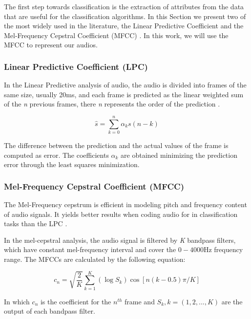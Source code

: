 \documentclass[12pt]{article}
\begin{document}
The first step towards classification is the extraction of attributes from the data that are useful for the classification algorithms. In this Section we present two of the most widely used in the literature, the Linear Predictive Coefficient \cite{Rabiner:1993:FSR:153687} and the Mel-Frequency Cepstral Coefficient (MFCC) \cite{xu2005automatic}. In this work, we will use the MFCC to represent our audios.

\subsubsection{Linear Predictive Coefficient (LPC)}\label{class:lpc}

In the Linear Predictive analysis of audio, the audio is divided into frames of the same size, usually 20ms, and each frame is predicted as the linear weighted sum of the \textit{n} previous frames, there \textit{n} represents the order of the prediction \cite{Rabiner:1993:FSR:153687}. 

\begin{equation}
	\hat{s} = \sum_{k=0}^{n} \alpha_ks(n-k)
	\label{eq:lpc}
\end{equation}


The difference between the prediction and the actual values of the frame is computed as error. The coefficients $\alpha_k$ are obtained minimizing the prediction error through the least squares minimization.


\subsubsection{Mel-Frequency Cepstral Coefficient (MFCC)} \label{class:mfcc}

The Mel-Frequency cepstrum is efficient in modeling pitch and frequency content of audio signals. It yields better results when coding audio for in classification tasks than the LPC \cite{li2001classification}.

In the mel-cepstral analysis, the audio signal is filtered by \textit{K} bandpass filters, which have constant mel-frequency interval and cover the $0-4000$Hz frequency range. The MFCCs are calculated by the following equation:

\begin{equation}
	c_n = \sqrt{\frac{2}{K}} \sum_{k=1}^{K} (\log S_k) \cos [n(k-0.5)\pi/K]
	\label{eq:mfcc}
\end{equation}

In which $c_n$ is the coefficient for the $n^{th}$ frame and $S_k, k=(1,2,...,K)$ are the output of each bandpass filter.
\end{document}
